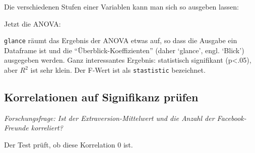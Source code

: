 \documentclass[12pt,ngerman,]{book}
\makeatletter
\newenvironment{Shaded}{\begin{snugshade}}{\end{snugshade}}
\newcommand{\KeywordTok}[1]{\textcolor[rgb]{0.13,0.29,0.53}{\textbf{#1}}}
\newcommand{\DataTypeTok}[1]{\textcolor[rgb]{0.13,0.29,0.53}{#1}}
\newcommand{\StringTok}[1]{\textcolor[rgb]{0.31,0.60,0.02}{#1}}
\newcommand{\CommentTok}[1]{\textcolor[rgb]{0.56,0.35,0.01}{\textit{#1}}}
\newcommand{\OperatorTok}[1]{\textcolor[rgb]{0.81,0.36,0.00}{\textbf{#1}}}
\newcommand{\NormalTok}[1]{#1}
\newenvironment{kframe}{%
\medskip{}
\setlength{\fboxsep}{.8em}
 \def\at@end@of@kframe{}%
 \ifinner\ifhmode%
  \def\at@end@of@kframe{\end{minipage}}%
  \begin{minipage}{\columnwidth}%
 \fi\fi%
 \def\FrameCommand##1{\hskip\@totalleftmargin \hskip-\fboxsep
 \colorbox{shadecolor}{##1}\hskip-\fboxsep
     \hskip-\linewidth \hskip-\@totalleftmargin \hskip\columnwidth}%
 \MakeFramed {\advance\hsize-\width
   \@totalleftmargin\z@ \linewidth\hsize
   \@setminipage}}%
 {\par\unskip\endMakeFramed%
 \at@end@of@kframe}
\renewenvironment{Shaded}{\begin{kframe}}{\end{kframe}}
\theoremstyle{definition}
\theoremstyle{definition}
\theoremstyle{remark}
\makeatother
\begin{document}
Die verschiedenen Stufen einer Variablen kann man sich so ausgeben
lassen:

\begin{Shaded}
\end{Shaded}

Jetzt die ANOVA:

\begin{Shaded}
\end{Shaded}

\texttt{glance} räumt das Ergebnis der ANOVA etwas auf, so dass die
Ausgabe ein Dataframe ist und die ``Überblick-Koeffizienten'' (daher
`glance', engl. `Blick') ausgegeben werden. Ganz interessantes Ergebnis:
statistisch signifikant (p\textless{}.05), aber \(R^2\) ist sehr klein.
Der F-Wert ist als \texttt{stastistic} bezeichnet.

\subsection{Korrelationen auf Signifikanz
prüfen}\label{korrelationen-auf-signifikanz-prufen}

\emph{Forschungsfrage: Ist der Extraversion-Mittelwert und die Anzahl
der Facebook-Freunde korreliert?}

Der Test prüft, ob diese Korrelation 0 ist.

\begin{Shaded}
\end{Shaded}
\end{document}
